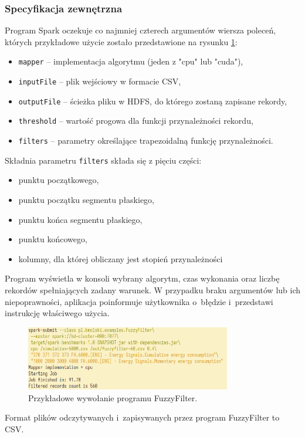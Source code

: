 \subsubsection*{Specyfikacja zewnętrzna}

Program Spark oczekuje co najmniej czterech argumentów wiersza poleceń, których przykładowe użycie
zostało przedstawione na rysunku \ref{fig:fuzzyfilter:run}:
\begin{itemize}
	\item \lstinline{mapper} -- implementacja algorytmu (jeden z "cpu" lub "cuda"),
	\item \lstinline{inputFile} -- plik wejściowy w formacie CSV,
	\item \lstinline{outputFile} -- ścieżka pliku w HDFS, do którego zostaną zapisane rekordy,
	\item \lstinline{threshold} -- wartość progowa dla funkcji przynależności rekordu,
    \item \lstinline{filters} -- parametry określające trapezoidalną funkcję przynależności.
\end{itemize}

Składnia parametru \lstinline{filters} składa się z pięciu części:
\begin{itemize}
	\item punktu początkowego,
	\item punktu początku segmentu płaskiego,
	\item punktu końca segmentu płaskiego,
	\item punktu końcowego,
    \item kolumny, dla której obliczany jest stopień przynależności
\end{itemize}

Program wyświetla w konsoli wybrany algorytm, czas wykonania oraz liczbę rekordów spełniających
zadany warunek. W przypadku braku argumentów lub ich niepoprawności, aplikacja poinformuje użytkownika
o~błędzie i~przedstawi instrukcję właściwego użycia.

\begin{figure}[h]
	\centering
	\includegraphics[width=0.8\textwidth]{graf/FuzzyFilter-interface.png}
	\caption{Przykładowe wywołanie programu FuzzyFilter.}
	\label{fig:fuzzyfilter:run}
\end{figure}

Format plików odczytywanych i~zapisywanych przez program FuzzyFilter to CSV.
